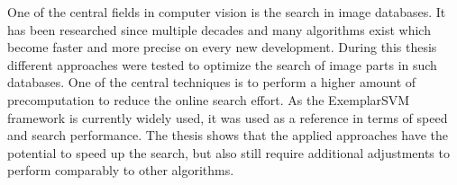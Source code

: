 One of the central fields in computer vision is the search in image databases. It has been researched since multiple decades and many algorithms exist which become faster and more precise on every new development. During this thesis different approaches were tested to optimize the search of image parts in such databases. One of the central techniques is to perform a higher amount of precomputation to reduce the online search effort. As the ExemplarSVM framework \cite{Malisiewicz2011} is currently widely used, it was used as a reference in terms of speed and search performance. The thesis shows that the applied approaches have the potential to speed up the search, but also still require additional adjustments to perform comparably to other algorithms.